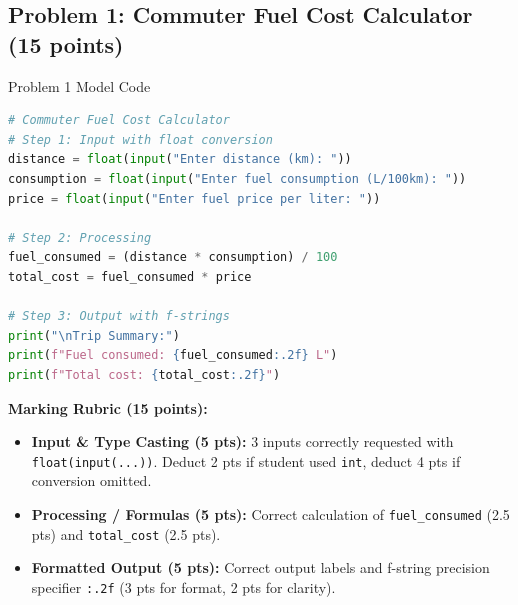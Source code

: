 \documentclass[11pt,a4paper]{article}
\begin{document}
\subsection*{Problem 1: Commuter Fuel Cost Calculator (15 points)}
\begin{solbox}{Problem 1 Model Code}
\begin{lstlisting}[language=Python]
# Commuter Fuel Cost Calculator
# Step 1: Input with float conversion
distance = float(input("Enter distance (km): "))
consumption = float(input("Enter fuel consumption (L/100km): "))
price = float(input("Enter fuel price per liter: "))

# Step 2: Processing
fuel_consumed = (distance * consumption) / 100
total_cost = fuel_consumed * price

# Step 3: Output with f-strings
print("\nTrip Summary:")
print(f"Fuel consumed: {fuel_consumed:.2f} L")
print(f"Total cost: {total_cost:.2f}")
\end{lstlisting}
\textbf{Marking Rubric (15 points):}
\begin{itemize}[noitemsep]
  \item \textbf{Input \& Type Casting (5 pts):} 3 inputs correctly requested with \texttt{float(input(...))}. Deduct 2 pts if student used \texttt{int}, deduct 4 pts if conversion omitted.
  \item \textbf{Processing / Formulas (5 pts):} Correct calculation of \texttt{fuel\_consumed} (2.5 pts) and \texttt{total\_cost} (2.5 pts).
  \item \textbf{Formatted Output (5 pts):} Correct output labels and f-string precision specifier \texttt{:.2f} (3 pts for format, 2 pts for clarity).
\end{itemize}
\end{solbox}

\vspace{0.3cm}
\end{document}
